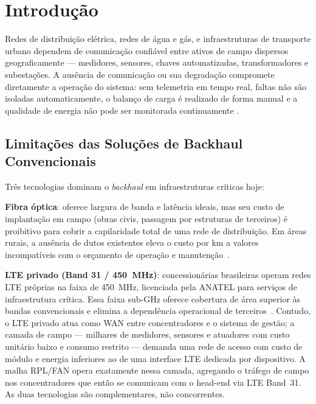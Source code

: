 \documentclass[conference]{IEEEtran}
\begin{document}
\section{Introdução}

Redes de distribuição elétrica, redes de água e gás, e infraestruturas de
transporte urbano dependem de comunicação confiável entre ativos de campo
dispersos geograficamente --- medidores, sensores, chaves automatizadas,
transformadores e subestações. A ausência de comunicação ou sua degradação
compromete diretamente a operação do sistema: sem telemetria em tempo real,
faltas não são isoladas automaticamente, o balanço de carga é realizado de
forma manual e a qualidade de energia não pode ser monitorada continuamente
\cite{gungor2011smartgrid}.

\subsection{Limitações das Soluções de Backhaul Convencionais}

Três tecnologias dominam o \textit{backhaul} em infraestruturas críticas hoje:

\textbf{Fibra óptica}: oferece largura de banda e latência ideais, mas seu custo
de implantação em campo (obras civis, passagem por estruturas de terceiros) é
proibitivo para cobrir a capilaridade total de uma rede de distribuição. Em
áreas rurais, a ausência de dutos existentes eleva o custo por km a valores
incompatíveis com o orçamento de operação e manutenção~\cite{gungor2011smartgrid}.

\textbf{LTE privado (Band 31 / 450~MHz)}: concessionárias brasileiras operam
redes LTE próprias na faixa de 450~MHz, licenciada pela ANATEL para serviços
de infraestrutura crítica. Essa faixa sub-GHz oferece cobertura de área
superior às bandas convencionais e elimina a dependência operacional de
terceiros~\cite{saputro2012routing}. Contudo, o LTE privado atua como WAN
entre concentradores e o sistema de gestão; a camada de campo --- milhares de
medidores, sensores e atuadores com custo unitário baixo e consumo restrito
--- demanda uma rede de acesso com custo de módulo e energia inferiores ao de
uma interface LTE dedicada por dispositivo. A malha RPL/FAN opera exatamente
nessa camada, agregando o tráfego de campo nos concentradores que então se
comunicam com o head-end via LTE Band~31. As duas tecnologias são
complementares, não concorrentes.
\end{document}
